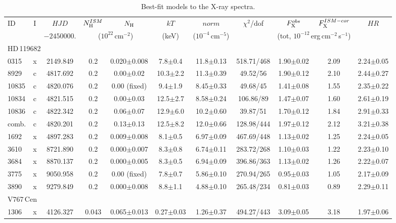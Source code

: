 \documentclass[a4paper,fleqn,usenatbib]{mnras}
\newcommand{\hd}{HD\,119682}
\newcommand{\vc}{V767\,Cen}
\begin{document}
\begin{table*}
  \caption{Best-fit models to the X-ray spectra. \label{fitsx}}
  \begin{tabular}{lcccccccccc}
    \hline
ID   & I & $HJD$ & $N_{\rm H}^{ISM}$ & $N_{\rm H}$ & $kT$ & $norm$ & $\chi^2$/dof & $F_{\rm X}^{obs}$ & $F_{\rm X}^{ISM-cor}$ & $HR$ \\
     &   & $-2450000.$ &\multicolumn{2}{c}{($10^{22}$\,cm$^{-2}$)} & (keV) & ($10^{-4}$\,cm$^{-5}$) & & \multicolumn{2}{c}{(tot, $10^{-12}$\,erg\,cm$^{-2}$\,s$^{-1}$)} & \\
\hline                                               
\multicolumn{11}{l}{\hd}\\
0315  &x&2149.849 &0.2 &0.020$\pm$0.008& 7.8$\pm$0.4 &11.8$\pm$0.13 &518.71/468 &1.90$\pm$0.02 &2.09 &2.24$\pm$0.05\\
8929  &c&4817.692 &0.2 &0.00$\pm$0.02  &10.3$\pm$2.2 &11.3$\pm$0.39 &49.52/56   &1.90$\pm$0.12 &2.10 &2.44$\pm$0.27\\
10835 &c&4820.076 &0.2 &0.00 (fixed)   & 9.4$\pm$1.9 &8.45$\pm$0.33 &49.68/45   &1.41$\pm$0.08 &1.55 &2.35$\pm$0.22\\
10834 &c&4821.515 &0.2 &0.00$\pm$0.03  &12.5$\pm$2.7 &8.58$\pm$0.24 &106.86/89  &1.47$\pm$0.07 &1.60 &2.61$\pm$0.19\\
10836 &c&4822.342 &0.2 &0.06$\pm$0.07  &12.9$\pm$6.0 &10.2$\pm$0.60 &39.87/51   &1.70$\pm$0.12 &1.84 &2.91$\pm$0.33\\
comb. &c&4820.201 &0.2 &0.13$\pm$0.13  &12.5$\pm$8.2 &12.0$\pm$0.66 &128.98/444 &1.97$\pm$0.12 &2.12 &3.21$\pm$0.38\\
1692  &x&4897.283 &0.2 &0.009$\pm$0.008& 8.1$\pm$0.5 &6.97$\pm$0.09 &467.69/448 &1.13$\pm$0.02 &1.25 &2.24$\pm$0.05\\
3610  &x&8721.890 &0.2 &0.000$\pm$0.007& 8.3$\pm$0.8 &6.74$\pm$0.11 &283.72/268 &1.10$\pm$0.03 &1.22 &2.23$\pm$0.10\\
3684  &x&8870.137 &0.2 &0.000$\pm$0.005& 8.3$\pm$0.5 &6.94$\pm$0.09 &396.86/363 &1.13$\pm$0.02 &1.26 &2.22$\pm$0.07\\
3775  &x&9050.958 &0.2 &0.00 (fixed)   & 7.8$\pm$0.7 &5.86$\pm$0.10 &270.94/265 &0.95$\pm$0.03 &1.05 &2.17$\pm$0.09\\
3890  &x&9279.849 &0.2 &0.000$\pm$0.008& 8.8$\pm$1.1 &4.88$\pm$0.10 &265.48/234 &0.81$\pm$0.03 &0.89 &2.29$\pm$0.11\\
\hline                                               
\multicolumn{11}{l}{\vc}\\
1306  &x&4126.327 &0.043&0.065$\pm$0.013& 0.27$\pm$0.03 &1.26$\pm$0.37 & 494.27/443 & 3.09$\pm$0.05 & 3.18 & 1.97$\pm$0.06\\

\end{tabular}
\end{table*}
\end{document}

